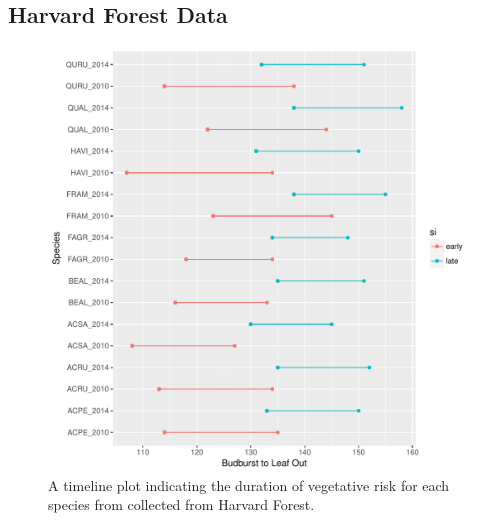 \documentclass{article}\usepackage[]{graphicx}\usepackage[]{color}
\makeatletter
\def\maxwidth{ %
  \ifdim\Gin@nat@width>\linewidth
    \linewidth
  \else
    \Gin@nat@width
  \fi
}
\makeatother
\begin{document}
\subsection*{Harvard Forest Data}
\begin{figure}[H]
\includegraphics[width=\maxwidth]{figure/forest-1} \caption[A timeline plot indicating the duration of vegetative risk for each species from collected from Harvard Forest]{A timeline plot indicating the duration of vegetative risk for each species from collected from Harvard Forest.}\label{fig:forest}
\end{figure}
\end{document}

